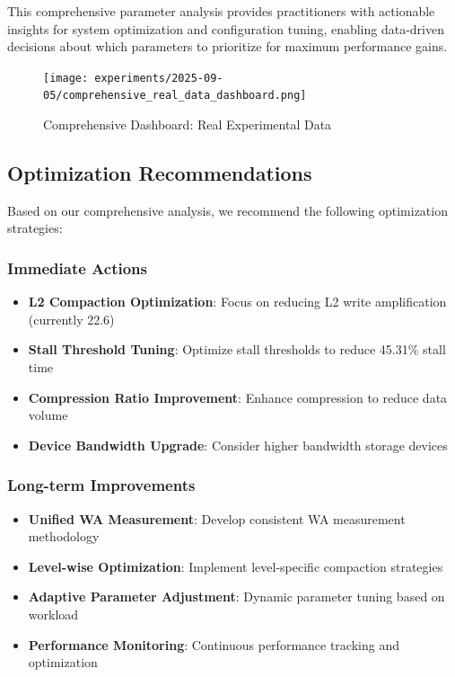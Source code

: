 \documentclass[11pt]{article}
\begin{document}
This comprehensive parameter analysis provides practitioners with actionable insights for system optimization and configuration tuning, enabling data-driven decisions about which parameters to prioritize for maximum performance gains.

\begin{figure}[H]
\centering
\texttt{[image: experiments/2025-09-05/comprehensive\_real\_data\_dashboard.png]}
\caption{Comprehensive Dashboard: Real Experimental Data}
\label{fig:parameter_dashboard}
\end{figure}

\subsection{Optimization Recommendations}

Based on our comprehensive analysis, we recommend the following optimization strategies:

\subsubsection{Immediate Actions}
\begin{itemize}
    \item \textbf{L2 Compaction Optimization}: Focus on reducing L2 write amplification (currently 22.6)
    \item \textbf{Stall Threshold Tuning}: Optimize stall thresholds to reduce 45.31\% stall time
    \item \textbf{Compression Ratio Improvement}: Enhance compression to reduce data volume
    \item \textbf{Device Bandwidth Upgrade}: Consider higher bandwidth storage devices
\end{itemize}

\subsubsection{Long-term Improvements}
\begin{itemize}
    \item \textbf{Unified WA Measurement}: Develop consistent WA measurement methodology
    \item \textbf{Level-wise Optimization}: Implement level-specific compaction strategies
    \item \textbf{Adaptive Parameter Adjustment}: Dynamic parameter tuning based on workload
    \item \textbf{Performance Monitoring}: Continuous performance tracking and optimization
\end{itemize}
\end{document}
